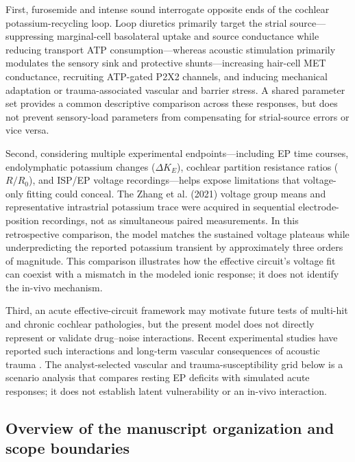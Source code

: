 \documentclass[final,5p,times]{elsarticle}
\begin{document}
First, furosemide and intense sound interrogate opposite ends of the cochlear potassium-recycling loop. Loop diuretics primarily target the strial source---suppressing marginal-cell basolateral uptake and source conductance while reducing transport ATP consumption---whereas acoustic stimulation primarily modulates the sensory sink and protective shunts---increasing hair-cell MET conductance, recruiting ATP-gated P2X2 channels, and inducing mechanical adaptation or trauma-associated vascular and barrier stress. A shared parameter set provides a common descriptive comparison across these responses, but does not prevent sensory-load parameters from compensating for strial-source errors or vice versa.

Second, considering multiple experimental endpoints---including EP time courses, endolymphatic potassium changes (\(\Delta K_E\)), cochlear partition resistance ratios (\(R/R_0\)), and ISP/EP voltage recordings---helps expose limitations that voltage-only fitting could conceal. The Zhang et al. (2021) voltage group means and representative intrastrial potassium trace were acquired in sequential electrode-position recordings, not as simultaneous paired measurements. In this retrospective comparison, the model matches the sustained voltage plateaus while underpredicting the reported potassium transient by approximately three orders of magnitude. This comparison illustrates how the effective circuit's voltage fit can coexist with a mismatch in the modeled ionic response; it does not identify the in-vivo mechanism.

Third, an acute effective-circuit framework may motivate future tests of multi-hit and chronic cochlear pathologies, but the present model does not directly represent or validate drug--noise interactions. Recent experimental studies have reported such interactions \citep{Su2026} and long-term vascular consequences of acoustic trauma \citep{Hou2020}. The analyst-selected vascular and trauma-susceptibility grid below is a scenario analysis that compares resting EP deficits with simulated acute responses; it does not establish latent vulnerability or an in-vivo interaction.

\subsection{Overview of the manuscript organization and scope boundaries}\label{sec:intro-organization}
\end{document}

